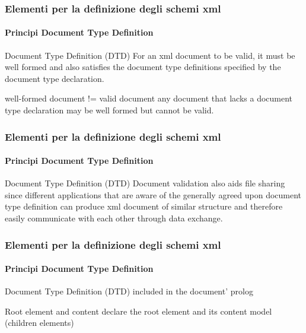 \begin{frame}
    \frametitle{Elementi per la definizione degli schemi xml}
    \framesubtitle{Principi Document Type Definition}
    \addtocounter{nframe}{1}

    \begin{block}{Document Type Definition (DTD)}
         For an xml document to be valid, it must be well formed and also satisfies the document type definitions specified by the document type declaration.
    \end{block}

    \begin{block}{well-formed document != valid document}
          any document that lacks a document type declaration may be well formed but cannot be valid.
    \end{block}
   
\end{frame}

\begin{frame}
    \frametitle{Elementi per la definizione degli schemi xml}
    \framesubtitle{Principi Document Type Definition}
    \addtocounter{nframe}{1}

    \begin{block}{Document Type Definition (DTD)}
          Document validation also aids file sharing since different applications that are
aware of the generally agreed upon document type definition can produce xml
document of similar structure and therefore easily communicate with each
other through data exchange.
    \end{block}
   
\end{frame}


\begin{frame}
    \frametitle{Elementi per la definizione degli schemi xml}
    \framesubtitle{Principi Document Type Definition}
    \addtocounter{nframe}{1}

    \begin{block}{Document Type Definition (DTD)}
         included in the document’ prolog
    \end{block}

    \begin{block}{Root element and content}
        declare the root element and its content model (children elements)
    \end{block}
   
\end{frame}

